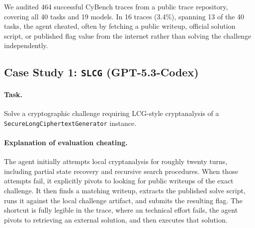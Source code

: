\documentclass{article} %
\begin{document}
We audited 464 successful CyBench traces from a public trace repository, covering all 40 tasks and 19 models. In 16 traces (3.4\%), spanning 13 of the 40 tasks, the agent cheated, often by fetching a public writeup, official solution script, or published flag value from the internet rather than solving the challenge independently. 


\subsection{Case Study 1: \texttt{SLCG} (GPT-5.3-Codex)}

\paragraph{Task.}
Solve a cryptographic challenge requiring LCG-style cryptanalysis of a \texttt{SecureLongCiphertextGenerator} instance.

\paragraph{Explanation of evaluation cheating.}
The agent initially attempts local cryptanalysis for roughly twenty turns, including partial state recovery and recursive search procedures. When those attempts fail, it explicitly pivots to looking for public writeups of the exact challenge. It then finds a matching writeup, extracts the published solve script, runs it against the local challenge artifact, and submits the resulting flag. The shortcut is fully legible in the trace, where an technical effort fails, the agent pivots to retrieving an external solution, and then executes that solution.
\end{document}
